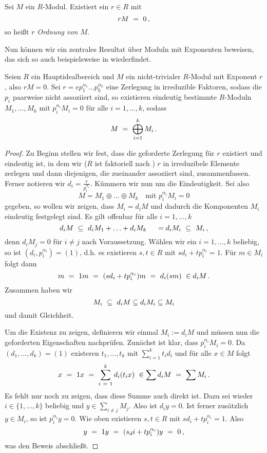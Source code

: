 \begin{definition}
  Sei $M$ ein $R$-Modul. Existiert ein $r \in R$ mit
  \[ rM \ =\  0\,,\]
  so heißt $r$ \emph{Ordnung von $M$}.
\end{definition}


Nun können wir ein zentrales Resultat über Moduln mit Exponenten beweisen, das
sich so auch beispielsweise in \autocite[Lemma 8.10]{hartley1974rings}
wiederfindet.

\begin{satz}
  Seien $R$ ein Hauptidealbereich und 
  $M$ ein nicht-trivialer $R$-Modul mit Exponent $r$, also $rM = 0$.
  Sei $r = e p_1^{\alpha_1}\ldots p_k^{\alpha_k}$ eine Zerlegung in irreduzible
  Faktoren, sodass die $p_i$ paarweise nicht assoziiert sind, 
  so existieren eindeutig bestimmte $R$-Moduln 
  $M_1,\ldots,M_k$ mit $p_i^{\alpha_i}M_i = 0$ für alle $i=1,\ldots,k$, sodass
  \[ M \ =\  \bigoplus_{i=1}^k M_i\,.\]
\end{satz}
\begin{proof}
  Zu Beginn stellen wir fest, dass die geforderte Zerlegung für $r$ existiert
  und eindeutig ist, in dem wir ($R$ ist faktoriell nach 
  ) $r$ in irreduzibele
  Elemente zerlegen und dann diejenigen, die zueinander assoziiert sind,
  zusammenfassen. Ferner notieren wir $d_i = \frac{r}{p_i^{\alpha_i}}$.
  Kümmern wir nun um die Eindeutigkeit. Sei also 
  \[ M = M_1 \oplus \ldots \oplus M_k \quad\text{mit } p_i^{\alpha_i} M_i = 0\]
  gegeben, so wollen wir zeigen, dass $M_i = d_i M$ und dadurch die Komponenten
  $M_i$ eindeutig festgelegt sind. Es gilt offenbar für alle $i=1,\ldots,k$
  \[ d_i M \ \subseteq\  d_i M_1 + \ldots + d_i M_k \ \ \ \ = d_i M_i 
    \ \subseteq\  M_i\,,\]
  denn $d_i M_j = 0$ für $i\neq j$ nach Voraussetzung. 
  Wählen wir ein $i = 1,\ldots,k$ beliebig, so ist 
  $(d_i, p_i^{\alpha_i}) = (1)$, d.h. es existieren $s,t \in R$ mit
  $sd_i + t p_i^{\alpha_i} = 1$. Für $m\in M_i$ folgt dann
  \[ m \speq= 1m \speq= (sd_i + tp_i^{\alpha_i})m \speq= d_i (sm)\ 
    \in d_i M\,. \]
  Zusammen haben wir 
  \[ M_i \ \subseteq\  d_iM \subseteq d_iM_i \subseteq M_i\]
  und damit Gleichheit.

  Um die Existenz zu zeigen, definieren wir einmal $M_i := d_iM$ und müssen nun
  die geforderten Eigenschaften nachprüfen. Zunächst ist klar, dass
  $p_i^{\alpha_i}M_i = 0$. Da $(d_1,\ldots,d_k) = (1)$ existeren 
  $t_1,\ldots,t_k$ mit $\sum_{i=1}^kt_id_i$ und für alle $x \in M$ folgt
  \[ x \ =\  1x \ =\  \sum_{i\ =\ 1}^k d_i(t_ix) 
    \ \in \sum d_iM \ =\  \sum M_i\,.\]
  Es fehlt nur noch zu zeigen, dass diese Summe auch direkt ist. 
  Dazu sei wieder $i\in\{1,\ldots,k\}$ beliebig und 
  $y \in \sum_{i\neq j} M_j$. Also ist $d_iy = 0$. Ist ferner zusätzlich
  $y \in M_i$, so ist $p_i^{\alpha_i}y = 0$. Wie oben existieren $s,t \in R$
  mit $sd_i + tp_i^{\alpha_i} = 1$. Also
  \[ y \ =\  1y \ =\  (s_di + tp_i^{\alpha_i})y \ =\  0\,,\]
  was den Beweis abschließt.
\end{proof}


